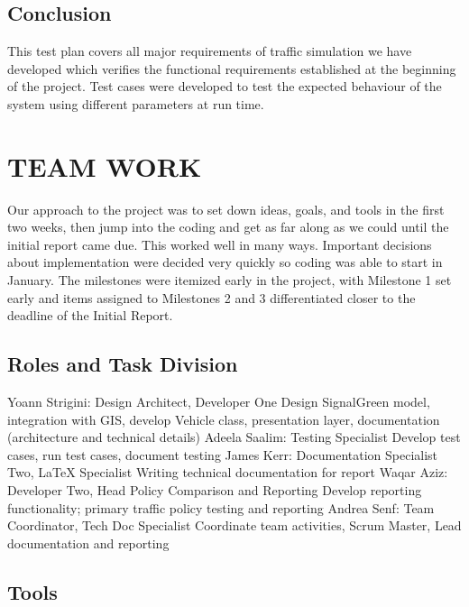 \documentclass[11pt]{article}
\begin{document}
\begin{enumerate}
\begin{itemize}
\begin{itemize}
	\end{itemize}
\end{itemize}
\subsection{Conclusion}
This test plan covers all major requirements of traffic simulation we have developed which verifies the functional requirements established at the beginning of the project. Test cases were developed to test the expected behaviour of the system using different parameters at run time.


\section{TEAM WORK}

Our approach to the project was to set down ideas, goals, and tools in the first two weeks, then jump into the coding and get as far along as we could until the initial report came due. This worked well in many ways. Important decisions about implementation were decided very quickly so coding was able to start in January. The milestones were itemized early in the project, with Milestone 1 set early and items assigned to Milestones 2 and 3 differentiated closer to the deadline of the Initial Report.


\subsection{Roles and Task Division}


Yoann Strigini: Design Architect, Developer One 
Design SignalGreen model, integration with GIS, develop Vehicle class, presentation layer, documentation (architecture and technical details)
Adeela Saalim: Testing Specialist
Develop test cases, run test cases, document testing
James Kerr: Documentation Specialist Two, LaTeX Specialist
Writing technical documentation for report
Waqar Aziz: Developer Two, Head Policy Comparison and Reporting 
Develop reporting functionality; primary traffic policy testing and reporting
Andrea Senf: Team Coordinator, Tech Doc Specialist
Coordinate team activities, Scrum Master, Lead documentation and reporting



\subsection{Tools}


\end{enumerate}
\end{document}
